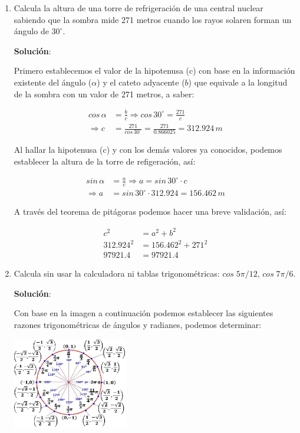 \documentclass[11pt,letterpaper]{article}
\begin{document}
\begin{enumerate}
	\item Calcula la altura de una torre de refrigeración de una central nuclear sabiendo que la sombra mide 271 metros cuando los rayos solaren forman un ángulo de $30^\circ$.

	\textbf{Solución}:

	Primero establecemos el valor de la hipotenusa (c) con base en la información existente del ángulo ($\alpha$) y el cateto adyacente ($b$) que equivale a la 
	longitud de la sombra con un valor de 271 metros, a saber:
	
	\begin{align}
		cos\,\alpha &= \frac{b}{c} \Rightarrow cos\,30^{\circ} = \frac{271}{c}\\
		\Rightarrow c &= \frac{271}{cos\,30^{\circ}} = \frac{271}{0.866025} = 312.924\,m
	\end{align}

	Al hallar la hipotenusa (c) y con los demás valores ya conocidos, podemos establecer la altura de la torre de refigeración, así:
	
	\begin{align}
		sin\,\alpha &= \frac{a}{c} \Rightarrow a = sin\,30^{\circ} \cdot c \\
		\Rightarrow a &= sin\,30^{\circ} \cdot 312.924 = 156.462\,m
	\end{align}

	A través del teorema de pitágoras podemos hacer una breve validación, así:

	\begin{align*}
		c^2 &= a^2 + b^2\\
		312.924^2 &= 156.462^2 + 271^2\\
		97921.4 &= 97921.4
	\end{align*}

	\item Calcula sin usar la calculadora ni tablas trigonométricas: $cos\;5\pi/12$, $cos\;7\pi/6$.

	\textbf{Solución}:
	
	Con base en la imagen a continuación podemos establecer las siguientes razones trigonométricas de ángulos y radianes, podemos determinar:
	
	\begin{center}
	\includegraphics[height=4cm]{circulo.jpeg}
	\end{center}


\end{enumerate}
\end{document}
